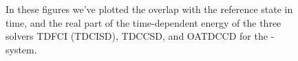 \begin{figure}
            \caption{In these figures we've plotted the overlap with the
            reference state in time, and the real part of the time-dependent
            energy of the three solvers TDFCI (TDCISD), TDCCSD, and OATDCCD for
            the -system.}
            \label{fig:he-stability}
        \end{figure}

